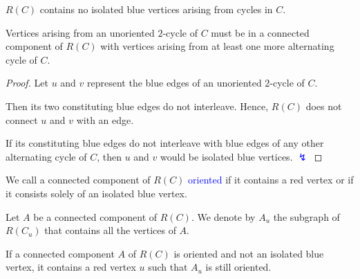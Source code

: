 \documentclass{beamer}
\theoremstyle{definition}
\def\spadding{\vspace{0.25cm}}
\def\b{\textcolor{blue}}
\begin{document}
\begin{frame}

\begin{lemma}
$R(C)$ contains no isolated blue vertices arising from cycles in $C$.
\end{lemma}\pause

\begin{lemma}
\label{lem:7}
Vertices arising from an unoriented $2$-cycle of $C$ must be in a connected component of $R(C)$ with vertices arising from at least one more alternating cycle of $C$.
\end{lemma}\pause

\begin{proof}
Let $u$ and $v$ represent the blue edges of an unoriented $2$-cycle of $C$. \par\pause
Then its two constituting blue edges do not interleave. Hence, $R(C)$ does not connect $u$ and $v$ with an edge. \par\pause
If its constituting blue edges do not interleave with blue edges of any other alternating cycle of $C$, then $u$ and $v$ would be isolated blue vertices. \b{$\lightning$}
\end{proof}

\end{frame}

\begin{frame}

\begin{definition}
We call a connected component of $R(C)$ \b{oriented} if it contains a red vertex or if it consists solely of an isolated blue vertex. \pause\spadding

Let $A$ be a connected component of $R(C)$. We denote by $A_u$ the subgraph of $R(C_u)$ that contains all the vertices of $A$.
\end{definition}\pause

\begin{lemma}
\label{lem:4}
If a connected component $A$ of $R(C)$ is oriented and not an isolated blue vertex, it contains a red vertex $u$ such that $A_u$ is still oriented.
\end{lemma}

\end{frame}
\end{document}
